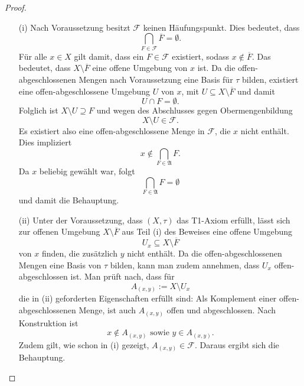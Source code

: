\begin{proof}
  \begin{itemize}
    \item[(i)]
      Nach Voraussetzung besitzt $\mathcal{F}$ keinen Häufungspunkt.
      Dies bedeutet, dass
      \begin{displaymath}
        \bigcap_{F \in \mathcal{F}} \overline F = \emptyset.
      \end{displaymath}
      Für alle $x \in X$ gilt damit, dass ein $F \in \mathcal{F}$ existiert, sodass $x \not\in \overline{F}$.
      Das bedeutet, dass $X \setminus \overline{F}$ eine offene Umgebung von $x$ ist.
      Da die offen-abgeschlossenen Mengen nach Voraussetzung eine Basis für $\tau$ bilden, existiert eine offen-abgeschlossene Umgebung $U$ von $x$, mit $U \subseteq X \setminus \overline{F}$ und damit
      \begin{displaymath}
        U \cap F = \emptyset.
      \end{displaymath}
      Folglich ist $X \setminus U \supseteq F$ und wegen des Abschlusses gegen Obermengenbildung
      \begin{displaymath}
        X \setminus U \in \mathcal{F}.
      \end{displaymath}
      Es existiert also eine offen-abgeschlossene Menge in $\mathcal{F}$, die $x$ nicht enthält. 
      Dies impliziert
      \begin{displaymath}
        x \not\in \bigcap_{F \in \mathfrak{A}} F.
      \end{displaymath}
      Da $x$ beliebig gewählt war, folgt 
      \begin{displaymath}
       \bigcap_{F \in \mathfrak{A}} F = \emptyset
      \end{displaymath}
      und damit die Behauptung.
    \item[(ii)] Unter der Voraussetzung, dass $(X,\tau)$ das T1-Axiom erfüllt, lässt sich zur offenen Umgebung $X \setminus \overline{F}$ aus Teil (i) des Beweises eine offene Umgebung 
      \begin{displaymath}
        U_x \subseteq X \setminus \overline{F}
      \end{displaymath}
      von $x$ finden, die zusätzlich $y$ nicht enthält. 
      Da die offen-abgeschlossenen Mengen eine Basis von $\tau$ bilden, kann man zudem annehmen, dass $U_x$ offen-abgeschlossen ist.
      Man prüft nach, dass für
      \begin{displaymath}
        A_{(x,y)} := X \setminus U_x
      \end{displaymath}
      die in (ii) geforderten Eigenschaften erfüllt sind:
      Als Komplement einer offen-abgeschlossenen Menge, ist auch $A_{(x,y)}$ offen und abgeschlossen.
      Nach Konstruktion ist 
      \begin{displaymath}
        x \not\in A_{(x,y)} \text{ sowie } y \in A_{(x,y)}.
      \end{displaymath}
      Zudem gilt, wie schon in (i) gezeigt, $A_{(x,y)} \in \mathcal{F}$.
      Daraus ergibt sich die Behauptung. \qedhere
  \end{itemize}
\end{proof}

